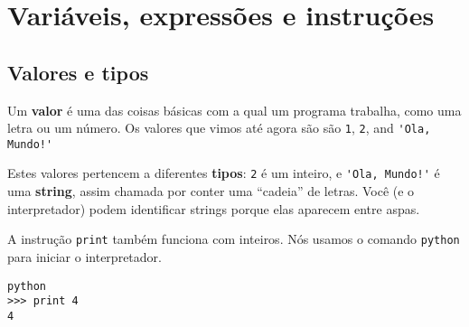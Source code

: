 
\chapter{Variáveis, expressões e instruções}
\section{Valores e tipos}



Um {\bf valor} é uma das coisas básicas com a qual um programa trabalha, 
como uma letra ou um número. Os valores que vimos até agora são
são {\tt 1}, {\tt 2}, and \verb"'Ola, Mundo!'"

Estes valores pertencem a diferentes {\bf tipos}:
{\tt 2} é um inteiro, e \verb"'Ola, Mundo!'" é uma {\bf string},
assim chamada por conter uma ``cadeia'' de letras.
Você (e o interpretador) podem identificar strings 
porque elas aparecem entre aspas.


A instrução {\tt print} também funciona com inteiros. Nós usamos o 
comando {\tt python} para iniciar o interpretador.

\beforeverb
\begin{verbatim}
python
>>> print 4
4
\end{verbatim}
\afterverb
%

